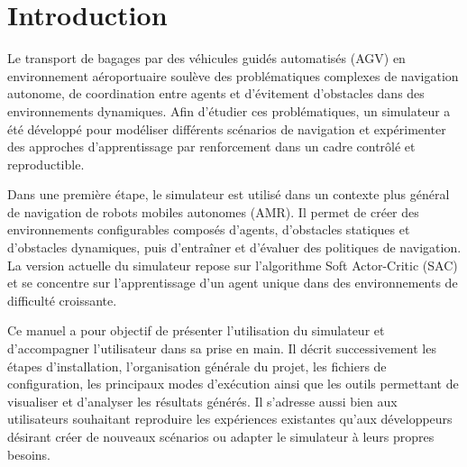 \section*{ Introduction }

Le transport de bagages par des véhicules guidés automatisés (AGV) en environnement aéroportuaire soulève des problématiques complexes de navigation autonome, de coordination entre agents et d'évitement d'obstacles dans des environnements dynamiques. Afin d'étudier ces problématiques, un simulateur a été développé pour modéliser différents scénarios de navigation et expérimenter des approches d'apprentissage par renforcement dans un cadre contrôlé et reproductible.

\vspace{10pt}

Dans une première étape, le simulateur est utilisé dans un contexte plus général de navigation de robots mobiles autonomes (AMR). Il permet de créer des environnements configurables composés d'agents, d'obstacles statiques et d'obstacles dynamiques, puis d'entraîner et d'évaluer des politiques de navigation. La version actuelle du simulateur repose sur l'algorithme Soft Actor-Critic (SAC) et se concentre sur l'apprentissage d'un agent unique dans des environnements de difficulté croissante.

\vspace{10pt}

Ce manuel a pour objectif de présenter l'utilisation du simulateur et d'accompagner l'utilisateur dans sa prise en main. Il décrit successivement les étapes d'installation, l'organisation générale du projet, les fichiers de configuration, les principaux modes d'exécution ainsi que les outils permettant de visualiser et d'analyser les résultats générés. Il s'adresse aussi bien aux utilisateurs souhaitant reproduire les expériences existantes qu'aux développeurs désirant créer de nouveaux scénarios ou adapter le simulateur à leurs propres besoins.
